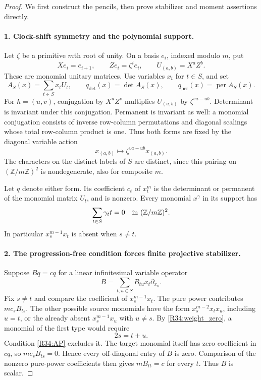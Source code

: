 \begin{proof}
We first construct the pencils, then prove stabilizer and
moment assertions directly.

\paragraph{1. Clock-shift symmetry and the polynomial support.}
Let $\zeta$ be a primitive $m$th root of unity. On a basis
$e_i$, indexed modulo $m$, put
\[
 Xe_i=e_{i+1},\qquad Ze_i=\zeta^i e_i,
              \qquad U_{(a,b)}=X^aZ^b.
\]
These are monomial unitary matrices. Use variables $x_t$ for
$t\in S$, and set
\[
 A_S(x)=\sum_{t\in S}x_tU_t,\qquad
 q_{\det}(x)=\det A_S(x),\qquad
 q_{\mathrm{per}}(x)=\operatorname{per}A_S(x).
\]
For $h=(u,v)$, conjugation by $X^uZ^v$ multiplies $U_{(a,b)}$
by $\zeta^{va-ub}$. Determinant is invariant under this
conjugation. Permanent is invariant as well: a monomial
conjugation consists of inverse row-column permutations
and diagonal scalings whose total row-column product is one.
Thus both forms are fixed by the diagonal variable action
\[
              x_{(a,b)}\longmapsto\zeta^{va-ub}x_{(a,b)}.
\]
The characters on the distinct labels of $S$ are distinct,
since this pairing on $(\mathbb Z/m\mathbb Z)^2$ is
nondegenerate, also for composite $m$.

Let $q$ denote either form. Its coefficient $c_t$ of $x_t^m$
is the determinant or permanent of the monomial matrix $U_t$,
and is nonzero. Every monomial $x^\gamma$ in its support has
\begin{equation}\label{R34:weight_zero}
                    \sum_{t\in S}\gamma_t t=0
                 \quad\hbox{in }(\mathbb Z/m\mathbb Z)^2.
\end{equation}
In particular $x_s^{m-1}x_t$ is absent when $s\ne t$.

\paragraph{2. The progression-free condition forces finite projective stabilizer.}
Suppose $Bq=cq$ for a linear infinitesimal variable operator
\[
                  B=\sum_{t,u\in S}B_{tu}x_t\partial_{x_u}.
\]
Fix $s\ne t$ and compare the coefficient of
$x_s^{m-1}x_t$. The pure power contributes $m c_sB_{ts}$.
The other possible source monomials have the form
$x_s^{m-2}x_t x_u$, including $u=t$, or the already absent
$x_s^{m-1}x_u$ with $u\ne s$.
By \eqref{R34:weight_zero}, a monomial of the first type
would require
\[
                         2s=t+u.
\]
Condition \eqref{R34:AP} excludes it. The target monomial
itself has zero coefficient in $cq$, so
$m c_sB_{ts}=0$. Hence every off-diagonal entry of $B$ is zero.
Comparison of the nonzero pure-power coefficients then gives
$mB_{tt}=c$ for every $t$. Thus $B$ is scalar.


\end{proof}
